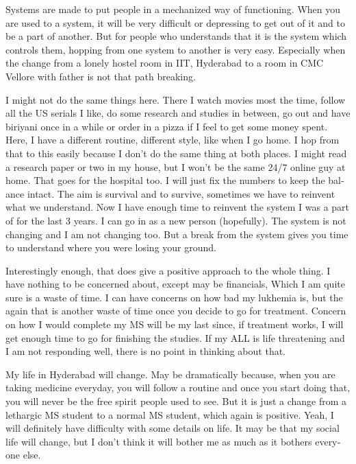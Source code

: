 \begin{english}
Systems are made to put people in a mechanized way of functioning. When you are used to a system,
it will be very difficult or depressing to get out of it and to be a part of another. But for people
who understands that it is the system which controls them, hopping from one system to another is very
easy. Especially when the change from a lonely hostel room in IIT, Hyderabad to a room in CMC 
Vellore with father is not that path breaking. 

I might not do the same things here. There I watch movies most the time, follow all the US serials
I like, do some research and studies in between, go out and have biriyani once in a while or order
in a pizza if I feel to get some money spent. Here, I have a different routine, different style, like 
when I go home. I hop from that to this easily because I don't do the same thing at both places.
I might read a research paper or two in my house, but I won't be the same 24/7 online guy at home.
That goes for the hospital too. I will just fix the numbers to keep the balance intact. The aim 
is survival and to survive, sometimes we have to reinvent what we understand. Now I have enough
time to reinvent the system I was a part of for the last 3 years. I can go in as a new person 
(hopefully). The system is not changing and I am not changing too. But a break from the system gives you time 
to understand where you were losing your ground.

Interestingly enough, that does give a positive approach to the whole thing. I have nothing to be 
concerned about, except may be financials, Which I am quite sure is a waste of time. I can have 
concerns on how bad my lukhemia is, but the again that is another waste of time once you decide
to go for treatment. Concern on how I would complete my MS will be my last since, if treatment
works, I will get enough time to go for finishing the studies. If my ALL is life threatening
and I am not responding well, there is no point in thinking about that.

My life in Hyderabad will change. May be dramatically because, when you are taking medicine 
everyday, you will follow a routine and once you start doing that, you will never be the free
spirit people used to see. But it is just a change from a lethargic MS student to a normal 
MS student, which again is positive. Yeah, I will definitely have difficulty with some details 
on life. It may be that my social life will change, but I don't think it will bother me as much 
as it bothers everyone else.


\end{english}
